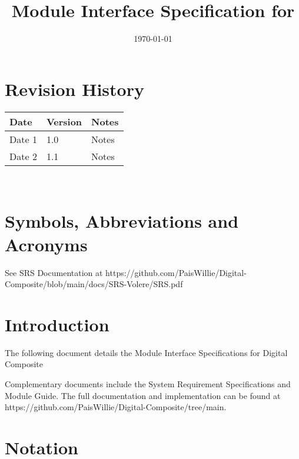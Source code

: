 \documentclass[12pt, titlepage]{article}
\begin{document}
\title{Module Interface Specification for \progname{}}

\author{\authname}

\date{\today}

\maketitle


\section{Revision History}

\begin{tabularx}{\textwidth}{p{3cm}p{2cm}X}
\toprule {\bf Date} & {\bf Version} & {\bf Notes}\\
\midrule
Date 1 & 1.0 & Notes\\
Date 2 & 1.1 & Notes\\
\bottomrule
\end{tabularx}

~\newpage

\section{Symbols, Abbreviations and Acronyms}

See SRS Documentation at https://github.com/PaisWillie/Digital-Composite/blob/main/docs/SRS-Volere/SRS.pdf


\newpage

\tableofcontents

\newpage


\section{Introduction}

The following document details the Module Interface Specifications for
Digital Composite

Complementary documents include the System Requirement Specifications
and Module Guide.  The full documentation and implementation can be
found at https://github.com/PaisWillie/Digital-Composite/tree/main.

\section{Notation}
\end{document}
